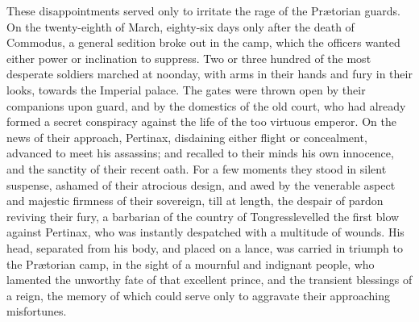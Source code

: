 These disappointments served only to irritate the rage of the
Prætorian guards. On the twenty-eighth of March, eighty-six days
only after the death of Commodus, a general sedition broke out in
the camp, which the officers wanted either power or inclination
to suppress. Two or three hundred of the most desperate soldiers
marched at noonday, with arms in their hands and fury in their
looks, towards the Imperial palace. The gates were thrown open by
their companions upon guard, and by the domestics of the old
court, who had already formed a secret conspiracy against the
life of the too virtuous emperor. On the news of their approach,
Pertinax, disdaining either flight or concealment, advanced to
meet his assassins; and recalled to their minds his own
innocence, and the sanctity of their recent oath. For a few
moments they stood in silent suspense, ashamed of their atrocious
design, and awed by the venerable aspect and majestic firmness of
their sovereign, till at length, the despair of pardon reviving
their fury, a barbarian of the country of Tongress\footnotemark[55] levelled
the first blow against Pertinax, who was instantly despatched
with a multitude of wounds. His head, separated from his body,
and placed on a lance, was carried in triumph to the Prætorian
camp, in the sight of a mournful and indignant people, who
lamented the unworthy fate of that excellent prince, and the
transient blessings of a reign, the memory of which could serve
only to aggravate their approaching misfortunes.\footnotemark[56]



